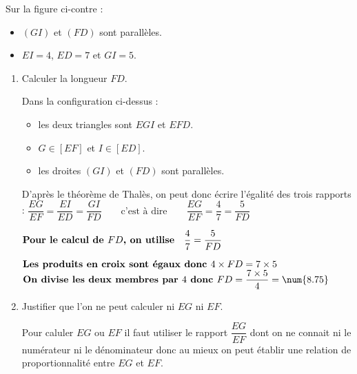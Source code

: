     \phantom{rrr}

    \begin{minipage}{0.6\linewidth}
        Sur la figure ci-contre :
        \begin{itemize}
            \item $(GI)$ et $(FD)$ sont parallèles.
            \item $EI=4$, $ED=7$ et $GI=5$.
        \end{itemize}
    \end{minipage}
    \begin{minipage}{0.3\linewidth}
    \end{minipage}

    \begin{enumerate}
        \item Calculer la longueur $FD$.

        {\color{red}
        Dans la configuration ci-dessus :
        \begin{itemize}
            \item les deux triangles sont $EGI$ et $EFD$.
            \item $G \in [EF]$ et $I \in [ED]$.
            \item les droites $(GI)$ et $(FD)$ sont parallèles.
        \end{itemize}
        D'après le théorème de Thalès, on peut donc écrire l'égalité des trois rapports :
        $\dfrac{EG}{EF}=\dfrac{EI}{ED}=\dfrac{GI}{FD}\qquad\mbox{c'est à dire}\qquad\dfrac{EG}{EF}=\dfrac{4}{7}=\dfrac{5}{FD}$

            $\mbox{\bf Pour le calcul de $FD$, on utilise} \quad \dfrac{4}{7}=\dfrac{5}{FD}$

            $\mbox{\bf Les produits en croix sont égaux donc }4\times FD=7\times5$
            $\mbox{\bf On divise les deux membres par $4$ donc }FD=\dfrac{7\times5}{4}=\num{8.75}$
        }
        \item Justifier que l'on ne peut calculer ni $EG$ ni $EF$.

        {\color{red} Pour caluler $EG$ ou $EF$ il faut utiliser le rapport $\dfrac{EG}{EF}$ dont on ne connait ni le
        numérateur ni le dénominateur donc au mieux on peut établir une relation de proportionnalité entre $EG$ et $EF$.}
    \end{enumerate}

